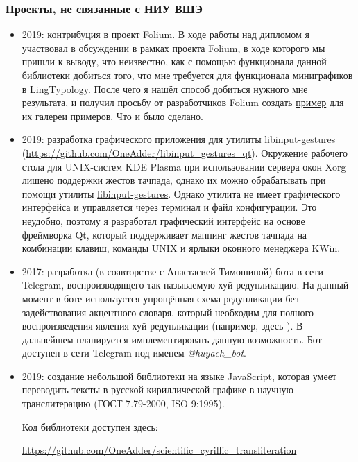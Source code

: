 \documentclass[a4paper,10pt]{article}
\begin{document}
\subsubsection{Проекты, не связанные с НИУ ВШЭ}
\begin{itemize}
 \item 2019: контрибуция в проект Folium. В ходе работы над дипломом я участвовал в обсуждении в рамках проекта \href{https://github.com/python-visualization/folium}{Folium}, в ходе которого мы пришли к выводу, что неизвестно, как с помощью функционала данной библиотеки добиться того, что мне требуется для функционала миниграфиков в LingTypology. После чего я нашёл способ добиться нужного мне результата, и получил просьбу от разработчиков Folium создать \href{https://github.com/python-visualization/folium/blob/master/examples/Minicharts.ipynb}{пример} для их галереи примеров. Что и было сделано.
 \item 2019: разработка графического приложения для утилиты libinput-gestures (\href{https://github.com/OneAdder/libinput\_gestures\_qt}{https://github.com/OneAdder/libinput\_gestures\_qt}). Окружение рабочего стола для UNIX-систем KDE Plasma при использовании сервера окон Xorg лишено поддержки жестов тачпада, однако их можно обрабатывать при помощи утилиты \href{https://github.com/bulletmark/libinput-gestures}{libinput-gestures}. Однако утилита не имеет графического интерфейса и управляется через терминал и файл конфигурации. Это неудобно, поэтому я разработал графический интерфейс на основе фреймворка Qt, который поддерживает маппинг жестов тачпада на комбинации клавиш, команды UNIX и ярлыки оконного менеджера KWin.
 \item 2017: разработка (в соавторстве с Анастасией Тимошиной) бота в сети Telegram, воспроизводящего так называемую хуй-редупликацию. На данный момент в боте используется упрощённая схема редупликации без задействования акцентного словаря, который необходим для полного воспроизведения явления хуй-редупликации (например, здесь \parencite{Piperski}). В дальнейшем планируется имплементировать данную возможность. Бот доступен в сети Telegram под именем \textit{@huyach\_bot}.
 \item 2019: создание небольшой библиотеки на языке JavaScript, которая умеет переводить тексты в русской кириллической графике в научную транслитерацию (ГОСТ 7.79-2000, ISO 9:1995).
 
 Код библиотеки доступен здесь:
 
 \href{https://github.com/OneAdder/scientific\_cyrillic\_transliteration}{https://github.com/OneAdder/scientific\_cyrillic\_transliteration}
\end{itemize}
\end{document}
